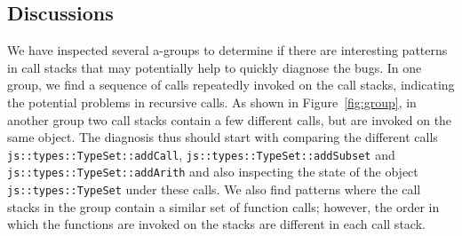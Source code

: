 \documentclass{llncs}
\newcommand{\todo}[1]{\textcolor{cyan}{\textbf{[#1]}}}
\begin{document}
\subsection{Discussions}
We have inspected several a-groups to determine if there are interesting patterns in call stacks that may potentially help to quickly diagnose the bugs. In one group, we find a sequence of calls repeatedly invoked on the call stacks, indicating the potential problems in recursive calls. As shown in Figure~\ref{fig:group}, in another group two call stacks contain a few different calls, but are invoked on the same object. The diagnosis thus should start with comparing the different calls {\tt js::types::TypeSet::addCall}, {\tt js::types::TypeSet::addSubset} and {\tt js::types::TypeSet::addArith} and also inspecting the state of the object {\tt js::types::TypeSet} under these calls. We also find patterns where the call stacks in the group contain a similar set of function calls; however, the order in which the functions are invoked on the stacks are different in each call stack.




\end{document}
